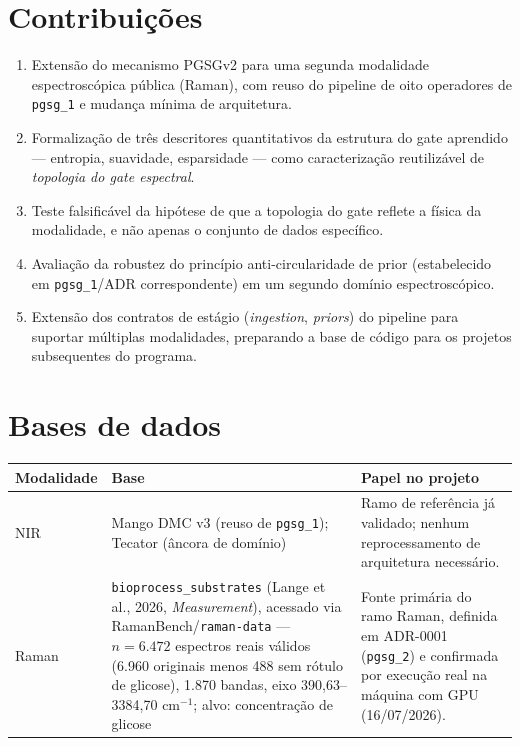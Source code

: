 \documentclass[11pt,a4paper]{article}
\begin{document}
\section{Contribuições}

\begin{enumerate}
\item Extensão do mecanismo PGSGv2 para uma segunda modalidade espectroscópica pública (Raman), com reuso do pipeline de oito operadores de \texttt{pgsg\_1} e mudança mínima de arquitetura.
\item Formalização de três descritores quantitativos da estrutura do gate aprendido --- entropia, suavidade, esparsidade --- como caracterização reutilizável de \emph{topologia do gate espectral}.
\item Teste falsificável da hipótese de que a topologia do gate reflete a física da modalidade, e não apenas o conjunto de dados específico.
\item Avaliação da robustez do princípio anti-circularidade de prior (estabelecido em \texttt{pgsg\_1}/ADR correspondente) em um segundo domínio espectroscópico.
\item Extensão dos contratos de estágio (\emph{ingestion}, \emph{priors}) do pipeline para suportar múltiplas modalidades, preparando a base de código para os projetos subsequentes do programa.
\end{enumerate}

\section{Bases de dados}
\label{sec:dados}

\begin{center}
\begin{tabular}{p{2.6cm}p{5.6cm}p{6.7cm}}
\toprule
Modalidade & Base & Papel no projeto \\
\midrule
NIR & Mango DMC v3 (reuso de \texttt{pgsg\_1}); Tecator (âncora de domínio) & Ramo de referência já validado; nenhum reprocessamento de arquitetura necessário. \\
Raman & \texttt{bioprocess\_substrates} (Lange et al., 2026, \emph{Measurement}), acessado via RamanBench/\texttt{raman-data} --- $n=6.472$ espectros reais válidos (6.960 originais menos 488 sem rótulo de glicose), 1.870 bandas, eixo 390,63--3384,70 cm$^{-1}$; alvo: concentração de glicose & Fonte primária do ramo Raman, definida em ADR-0001 (\texttt{pgsg\_2}) e confirmada por execução real na máquina com GPU (16/07/2026). \\
\bottomrule
\end{tabular}
\end{center}
\end{document}
